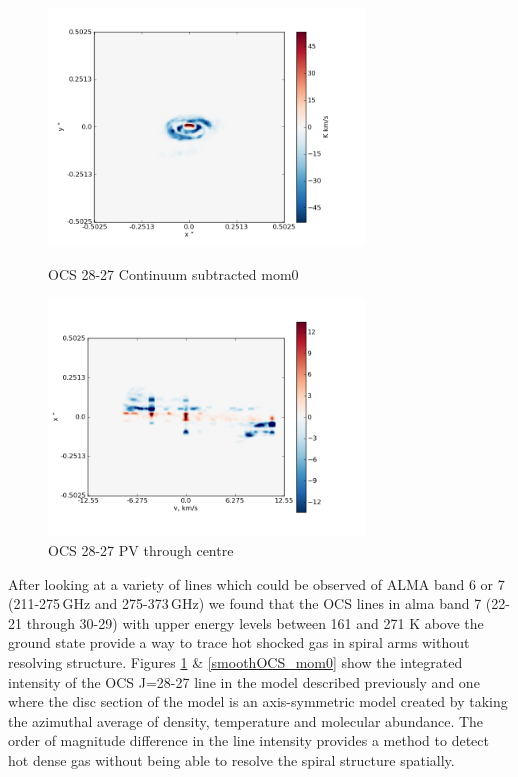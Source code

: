 \documentclass[useAMS,usenatbib]{mn2e}
\begin{document}
\begin{figure}[H]
 \includegraphics[width=84mm]{Figures/sim/imageOCS_28-27_30deg_composite_contSub.png}
 \label{OCS_mom0}
 \caption{OCS 28-27 Continuum subtracted mom0}
\end{figure}

\begin{figure}[H]
 \includegraphics[width=84mm]{Figures/sim/imageOCS_28-27_30deg_composite_PV_centre.png}

 \caption{OCS 28-27 PV through centre}
\end{figure}

After looking at a variety of lines which could be observed of ALMA band 6 or 7 (211-275$\,$GHz and 275-373$\,$GHz) we found that the OCS lines in alma band 7 (22-21 through 30-29) with upper energy levels between 161 and 271 K above the ground state provide a way to trace hot shocked gas in spiral arms without resolving structure. Figures \ref{OCS_mom0} \& \ref{smoothOCS_mom0} show the integrated intensity of the OCS J=28-27 line in the model described previously and one where the disc section of the model is an axis-symmetric model created by taking the azimuthal average of density, temperature and molecular abundance. The order of magnitude difference in the line intensity provides a method to detect hot dense gas without being able to resolve the spiral structure spatially.\newline
\end{document}
